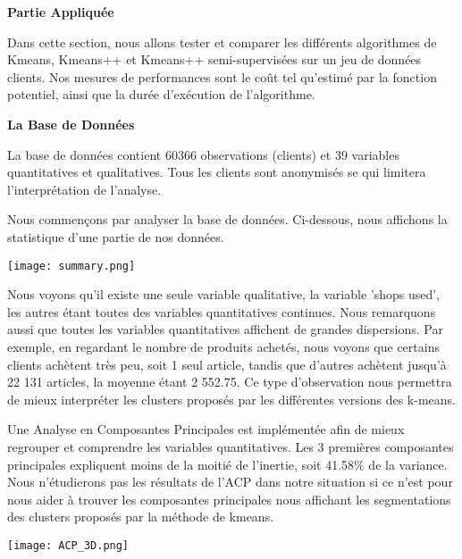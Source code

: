\documentclass[ ]{article}
\begin{document}
\noindent
{\LARGE \textbf{Partie Appliquée}}
\vspace{5 mm}

\noindent
Dans cette section, nous allons tester et comparer les différents algorithmes de Kmeans, Kmeans++ et Kmeans++ semi-supervisées sur un jeu de données clients. Nos mesures de performances sont le coût tel qu'estimé par la fonction potentiel, ainsi que la durée d'exécution de l'algorithme.

\vspace{10 mm}

\noindent
{\Large \textbf{La Base de Données}}
\vspace{5 mm}

\noindent
La base de données contient 60366 observations (clients) et 39 variables quantitatives et qualitatives. Tous les clients sont anonymisés se qui limitera l'interprétation de l'analyse.

\noindent
Nous commençons par analyser la base de données. Ci-dessous, nous affichons la statistique d'une partie de nos données. 
\begin{center}

\texttt{[image: summary.png]}
\end{center}

\noindent
Nous voyons qu'il existe une seule variable qualitative, la variable 'shops used', les autres étant toutes des variables quantitatives continues. Nous remarquons aussi que toutes les variables quantitatives affichent de grandes dispersions. Par exemple, en regardant le nombre de produits achetés, nous voyons que certains clients achètent très peu, soit 1 seul article, tandis que d'autres achètent jusqu'à 22 131 articles, la moyenne étant 2 552.75. Ce type d'observation nous permettra de mieux interpréter les clusters proposés par les différentes versions des k-means.

\noindent
Une Analyse en Composantes Principales est implémentée afin de mieux regrouper et comprendre les variables quantitatives. Les 3 premières composantes principales expliquent moins de la moitié de l'inertie, soit 41.58\% de la variance.  Nous n'étudierons pas les résultats de l'ACP dans notre situation si ce n'est pour nous aider à trouver les composantes principales nous affichant les segmentations des clusters proposés par la méthode de kmeans.

\begin{center}
\texttt{[image: ACP\_3D.png]}
\end{center}
\end{document}
